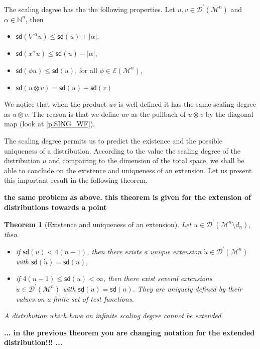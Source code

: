 \documentclass[11pt]{book}
\newcommand{\com}[1]{{\color{red}\bf #1}}
\newcommand{\sd}{\mathsf{sd}}
\newcommand{\abs}[1]{\left|#1\right|}
\newcommand{\Dcal}{\mathcal{D}}
\newcommand{\Ecal}{\mathcal{E}}
\newcommand{\Mcal}{\mathcal{M}}
\newcommand{\Nbb}{\mathbb{N}}
\theoremstyle{break}
\newtheorem{theorem}{Theorem}[chapter]
\begin{document}
The scaling degree has the the following properties. Let $u, v \in\Dcal^\prime(\Mcal^n)$ and $\alpha \in \Nbb^n$, then
%
\begin{itemize}
\setlength\itemsep{0pt}
\item $\sd(\nabla^\alpha u) \leq \sd(u) + \abs{\alpha}$,
\item $\sd(x^\alpha u) \leq \sd(u) - \abs{\alpha}$,
\item $\sd(\phi u) \leq \sd(u)$, for all $\phi \in \Ecal(\Mcal^n)$, 
\item $\sd(u \otimes v) = \sd(u) + \sd(v)$
\end{itemize}
%
We notice that when the product $uv$ is well defined it has the same scaling degree as $u \otimes v$. The reason is that we define $uv$ as the pullback of $u \otimes v$ by the diagonal map (look at \ref{p:SING_WF}).


The scaling degree permits us to predict the existence and the possible uniqueness of a distribution. According to the value the scaling degree of the distribution $u$ and compairing to the dimension of the total space, we shall be able to conclude on the existence and uniqueness of an extension. Let us present this important result in the following theorem.


\com{the same problem as above. this theorem is given for the extension of distributions towards a point}

\begin{theorem}[Existence and uniqueness of an extension] \label{theo:extension_distribution}
Let $u \in \Dcal^\prime(\Mcal^n \setminus d_n )$, then
%
\vspace*{-5pt}
\begin{itemize}
\setlength\itemsep{0pt}
\item if $\sd(u) < 4(n-1)$, then there exists a unique extension $\dot{u} \in \Dcal^\prime(\Mcal^n)$ with $\sd(\dot{u})=\sd(u)$,
%
\item if $4(n-1)\leq\sd(u)<\infty$, then there exist several extensions $\dot{u} \in \Dcal^\prime(\Mcal^n)$ with $\sd(\dot{u})=\sd(u)$. They are uniquely defined by their values on a finite set of test functions.
\end{itemize}
%
A distribution which have an infinite scaling degree cannot be extended.
\end{theorem}
\com{... in the previous theorem you are changing notation for the extended distribution!!! ... }



\bigskip
\end{document}
